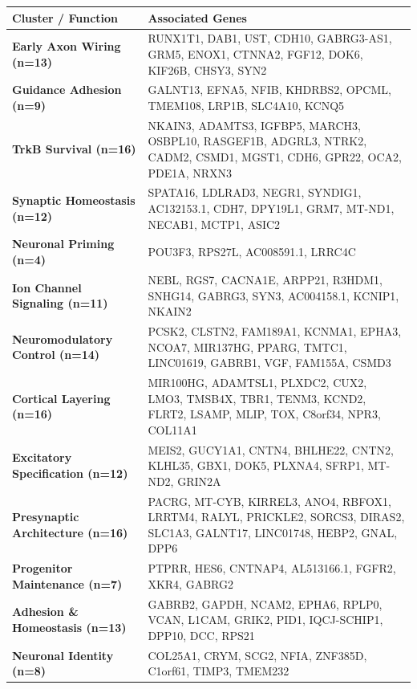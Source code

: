 \begin{longtable}{p{} p{}}
\hline
\textbf{Cluster / Function} & \textbf{Associated Genes} \\
\hline
\endhead
\textbf{Early Axon Wiring (n=13)} & RUNX1T1,  DAB1,  UST,  CDH10,  GABRG3-AS1,  GRM5,  ENOX1,  CTNNA2,  FGF12,  DOK6,  KIF26B,  CHSY3,  SYN2 \\
\hline
\textbf{Guidance Adhesion (n=9)} & GALNT13,  EFNA5,  NFIB,  KHDRBS2,  OPCML,  TMEM108,  LRP1B,  SLC4A10,  KCNQ5 \\
\hline
\textbf{TrkB Survival (n=16)} & NKAIN3,  ADAMTS3,  IGFBP5,  MARCH3,  OSBPL10,  RASGEF1B,  ADGRL3,  NTRK2,  CADM2,  CSMD1,  MGST1,  CDH6,  GPR22,  OCA2,  PDE1A,  NRXN3 \\
\hline
\textbf{Synaptic Homeostasis (n=12)} & SPATA16,  LDLRAD3,  NEGR1,  SYNDIG1,  AC132153.1,  CDH7,  DPY19L1,  GRM7,  MT-ND1,  NECAB1,  MCTP1,  ASIC2 \\
\hline
\textbf{Neuronal Priming (n=4)} & POU3F3,  RPS27L,  AC008591.1,  LRRC4C \\
\hline
\textbf{Ion Channel Signaling (n=11)} & NEBL,  RGS7,  CACNA1E,  ARPP21,  R3HDM1,  SNHG14,  GABRG3,  SYN3,  AC004158.1,  KCNIP1,  NKAIN2 \\
\hline
\textbf{Neuromodulatory Control (n=14)} & PCSK2,  CLSTN2,  FAM189A1,  KCNMA1,  EPHA3,  NCOA7,  MIR137HG,  PPARG,  TMTC1,  LINC01619,  GABRB1,  VGF,  FAM155A,  CSMD3 \\
\hline
\textbf{Cortical Layering (n=16)} & MIR100HG,  ADAMTSL1,  PLXDC2,  CUX2,  LMO3,  TMSB4X,  TBR1,  TENM3,  KCND2,  FLRT2,  LSAMP,  MLIP,  TOX,  C8orf34,  NPR3,  COL11A1 \\
\hline
\textbf{Excitatory Specification (n=12)} & MEIS2,  GUCY1A1,  CNTN4,  BHLHE22,  CNTN2,  KLHL35,  GBX1,  DOK5,  PLXNA4,  SFRP1,  MT-ND2,  GRIN2A \\
\hline
\textbf{Presynaptic Architecture (n=16)} & PACRG,  MT-CYB,  KIRREL3,  ANO4,  RBFOX1,  LRRTM4,  RALYL,  PRICKLE2,  SORCS3,  DIRAS2,  SLC1A3,  GALNT17,  LINC01748,  HEBP2,  GNAL,  DPP6 \\
\hline
\textbf{Progenitor Maintenance (n=7)} & PTPRR,  HES6,  CNTNAP4,  AL513166.1,  FGFR2,  XKR4,  GABRG2 \\
\hline
\textbf{Adhesion \& Homeostasis (n=13)} & GABRB2,  GAPDH,  NCAM2,  EPHA6,  RPLP0,  VCAN,  L1CAM,  GRIK2,  PID1,  IQCJ-SCHIP1,  DPP10,  DCC,  RPS21 \\
\hline
\textbf{Neuronal Identity (n=8)} & COL25A1,  CRYM,  SCG2,  NFIA,  ZNF385D,  C1orf61,  TIMP3,  TMEM232 \\

\end{longtable}
